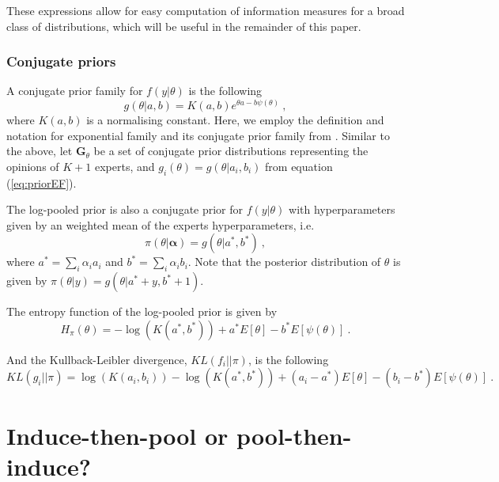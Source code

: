 \documentclass[a4paper, notitlepage, 10pt]{article}
\begin{document}
These expressions allow for easy computation of information measures for a broad class of distributions, which will be useful in the remainder of this paper.

\subsubsection*{Conjugate priors}

A conjugate prior family for $f(y|\theta)$ is the following
\begin{equation}
\label{eq:priorEF}
g(\theta | a, b) = K(a,b) e^{\theta a - b \psi(\theta)} \: ,
\end{equation}
where $K(a,b)$ is a normalising constant.
Here, we employ the definition and notation for exponential family and its conjugate prior family from \citet[chapter 3]{robert2001bayesian}.
Similar to the above, let $\mathbf{G}_{\theta}$ be a set of conjugate prior distributions representing the opinions of $K+1$ experts, and $g_i(\theta) = g(\theta | a_i, b_i)$ from equation (\ref{eq:priorEF}).

The log-pooled prior is also a conjugate prior for $f(y|\theta)$ with hyperparameters given by an weighted mean of the experts hyperparameters, i.e.
\begin{equation}
\label{eq:poolpriorEF}
\pi(\theta|\boldsymbol\alpha) = g(\theta | a^*, b^*) \: ,
\end{equation}
where $a^* = \sum_{i} \alpha_i a_i$ and $b^* = \sum_{i} \alpha_i b_i$.
Note that the posterior distribution of $\theta$ is given by $\pi(\theta | y) = g(\theta | a^* + y, b^* + 1)$.

The entropy function of the log-pooled prior is given by
\begin{equation}
\label{eq:entropypriorEF}
H_\pi(\theta) = - \log (K(a^*, b^*)) + a^*  E[\theta]-  b^*  E[\psi(\theta)] \: .
\end{equation}

And the Kullback-Leibler divergence, $KL(f_i || \pi)$, is the following
\begin{equation}
\label{eq:KLpriorEF}
KL(g_i || \pi) = \log( K(a_i,b_i)) - \log(K(a^*,b^*)) + (a_i - a^*) E[\theta] - (b_i - b^*) E[\psi(\theta)] \: .
\end{equation}

\section*{Induce-then-pool or pool-then-induce?}
\end{document}
